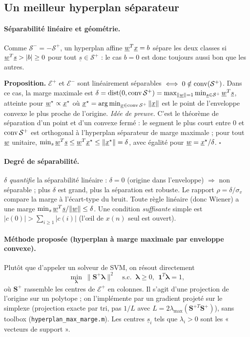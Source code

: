 \subsection{Un meilleur hyperplan séparateur}\label{sec:sep}
\paragraph{Séparabilité linéaire et géométrie.}
Comme $\mathcal S^-=-\mathcal S^+$, un hyperplan affine $\underline{w}^T\underline{x}=b$ sépare les deux classes si $\underline{w}^T\underline s>|b|\ge 0$ pour tout $\underline s\in\mathcal S^+$ : le cas $b=0$ est donc toujours aussi bon que les autres.

\noindent\textbf{Proposition.} 
$\mathcal E^+$ et $\mathcal E^-$ sont linéairement séparables $\iff 0\notin\operatorname{conv}(\mathcal S^+)$. Dans ce cas, la marge maximale est $\delta=\operatorname{dist}(0,\operatorname{conv}\mathcal S^+)=\max_{\|\underline{w}\|=1}\min_{\underline s\in\mathcal S^+}\underline{w}^T\underline s$, atteinte pour $\underline{w}^\star\propto\underline x^\star$ où $\underline x^\star=\arg\min_{\underline x\in\operatorname{conv}\mathcal S^+}\|\underline x\|$ est le point de l'enveloppe convexe le plus proche de l'origine.
\noindent\emph{Idée de preuve.} C'est le théorème de séparation d'un point et d'un convexe fermé : le segment le plus court entre $0$ et $\operatorname{conv}\mathcal S^+$ est orthogonal à l'hyperplan séparateur de marge maximale ; pour tout $\underline{w}$ unitaire, $\min_s\underline{w}^T\underline s\le\underline{w}^T\underline x^\star\le\|\underline x^\star\|=\delta$, avec égalité pour $\underline{w}=\underline x^\star/\delta$. \hfill$\square$

\paragraph{Degré de séparabilité.} $\delta$ \emph{quantifie} la séparabilité linéaire : $\delta=0$ (origine dans l'enveloppe) $\Rightarrow$ non séparable ; plus $\delta$ est grand, plus la séparation est robuste. Le rapport $\rho=\delta/\sigma_v$ compare la marge à l'écart-type du bruit. Toute règle linéaire (donc Wiener) a une marge $\min_s\underline{w}^T\underline s/\|\underline{w}\|\le\delta$. Une condition \emph{suffisante} simple est $|c(0)|>\sum_{i\ge1}|c(i)|$ (l'œil de $x(n)$ seul est ouvert).

\paragraph{Méthode proposée (hyperplan à marge maximale par enveloppe convexe).}
Plutôt que d'appeler un solveur de SVM, on résout directement
\begin{equation}
 \min_{\bm\lambda}\ \|\bm S^+\bm\lambda\|^2\quad\text{s.c. }\ \bm\lambda\ge0,\ \ \bm 1^T\bm\lambda=1,
\end{equation}
où $\bm S^+$ rassemble les centres de $\mathcal E^+$ en colonnes. Il s'agit d'une projection de l'origine sur un polytope ; on l'implémente par un gradient projeté sur le simplexe (projection exacte par tri, pas $1/L$ avec $L=2\lambda_{\max}(\bm S^{+T}\bm S^+)$), sans toolbox (\texttt{hyperplan\_max\_marge.m}). Les centres $\underline s_i$ tels que $\lambda_i>0$ sont les « vecteurs de support ».


